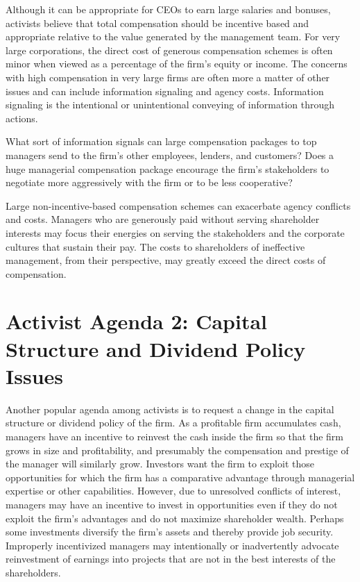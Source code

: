 \documentclass[11pt]{article}
\begin{document}
Although it can be appropriate for CEOs to earn large salaries and bonuses, activists believe that total compensation should be incentive based and appropriate relative to the value generated by the management team. For very large corporations, the direct cost of generous compensation schemes is often minor when viewed as a percentage of the firm's equity or income. The concerns with high compensation in very large firms are often more a matter of other issues and can include information signaling and agency costs. Information signaling is the intentional or unintentional conveying of information through actions.

What sort of information signals can large compensation packages to top managers send to the firm's other employees, lenders, and customers? Does a huge managerial compensation package encourage the firm's stakeholders to negotiate more aggressively with the firm or to be less cooperative?

Large non-incentive-based compensation schemes can exacerbate agency conflicts and costs. Managers who are generously paid without serving shareholder interests may focus their energies on serving the stakeholders and the corporate cultures that sustain their pay. The costs to shareholders of ineffective management, from their perspective, may greatly exceed the direct costs of compensation.

\section*{Activist Agenda 2: Capital Structure and Dividend Policy Issues}
Another popular agenda among activists is to request a change in the capital structure or dividend policy of the firm. As a profitable firm accumulates cash, managers have an incentive to reinvest the cash inside the firm so that the firm grows in size and profitability, and presumably the compensation and prestige of the manager will similarly grow. Investors want the firm to exploit those opportunities for which the firm has a comparative advantage through managerial expertise or other capabilities. However, due to unresolved conflicts of interest, managers may have an incentive to invest in opportunities even if they do not exploit the firm's advantages and do not maximize shareholder wealth. Perhaps some investments diversify the firm's assets and thereby provide job security. Improperly incentivized managers may intentionally or inadvertently advocate reinvestment of earnings into projects that are not in the best interests of the shareholders.
\end{document}
